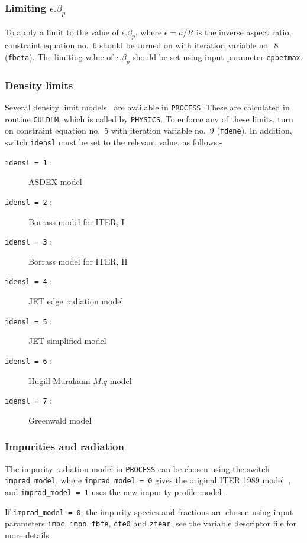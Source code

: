 \documentclass[11pt,a4paper]{report}
\newcommand{\process}{\mbox{\texttt{PROCESS}}}
\begin{document}
\subsubsection*{Limiting $\epsilon.\beta_p$}

To apply a limit to the value of $\epsilon.\beta_p$, where $\epsilon = a/R$ is
the inverse aspect ratio, constraint equation no.\ 6 should be turned on with
iteration variable no.\ 8 (\texttt{fbeta}). The limiting value of
$\epsilon.\beta_p$ should be set using input parameter \texttt{epbetmax}.

\subsubsection{Density limits}

Several density limit models~\cite{172} are available in \process. These are
calculated in routine \texttt{CULDLM}, which is called by \texttt{PHYSICS}.
To enforce any of these limits, turn on constraint equation no.~5 with
iteration variable no.~9 (\texttt{fdene}).  In addition, switch
\texttt{idensl} must be set to the relevant value, as follows:-
\begin{description} %
\item [\texttt{idensl = 1} :] ASDEX model
\item [\texttt{idensl = 2} :] Borrass model for ITER, I
\item [\texttt{idensl = 3} :] Borrass model for ITER, II
\item [\texttt{idensl = 4} :] JET edge radiation model
\item [\texttt{idensl = 5} :] JET simplified model
\item [\texttt{idensl = 6} :] Hugill-Murakami $M.q$ model
\item [\texttt{idensl = 7} :] Greenwald model
\end{description}

\subsubsection{Impurities and radiation}
\label{sec:radiation}

The impurity radiation model in \process\/ can be chosen using the switch
\texttt{imprad\_model}, where \texttt{imprad\_model = 0} gives the original
ITER 1989 model~\cite{kovari_physics}, and \texttt{imprad\_model = 1} uses the
new impurity profile model~\cite{hanni_radiation}.

If \texttt{imprad\_model = 0}, the impurity species and fractions are chosen using input
parameters \texttt{impc}, \texttt{impo}, \texttt{fbfe}, \texttt{cfe0} and
\texttt{zfear}; see the variable descriptor file for more details.
\end{document}
